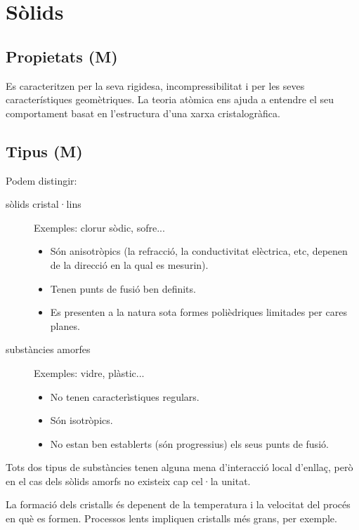 


\section{Sòlids}
\subsection{Propietats (M)}

Es caracteritzen per la seva rigidesa, incompressibilitat i per les seves característiques geomètriques.
La teoria atòmica ens ajuda a entendre el seu comportament basat en l'estructura d'una xarxa cristalogràfica.



\subsection{Tipus (M)}

Podem distingir:
\begin{description}
\item[sòlids cristal·lins] Exemples: clorur sòdic, sofre... 
\begin{itemize}
\item Són anisotròpics (la refracció, la conductivitat elèctrica, etc, depenen de la direcció en la qual es mesurin). 
\item Tenen punts de fusió ben definits. 
\item Es presenten a la natura sota formes polièdriques limitades per cares planes.
\end{itemize}
\item[substàncies amorfes] Exemples: vidre, plàstic... \begin{itemize}
\item No tenen caracterìstiques regulars. 
\item Són isotròpics. 
\item No estan ben establerts (són progressius) els seus punts de fusió.
\end{itemize}
\end{description}
Tots dos tipus de substàncies tenen alguna mena d'interacció local d'enllaç, però en el cas dels sòlids amorfs no existeix cap cel·la unitat.

La formació dels cristalls és depenent de la temperatura i la velocitat del procés en què es formen. Processos lents impliquen cristalls més grans, per exemple.

